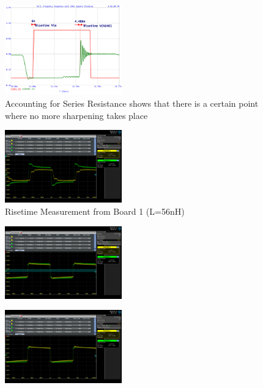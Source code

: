 \documentclass[journal]{IEEEtran} \usepackage[english]{babel}
\begin{document}
\begin{figure}[htb]
\centering
\includegraphics[width=0.45\textwidth]{Probed_Input_N10_N240_NoSeriesResistance}
\caption{Accounting for Series Resistance shows that there is a certain point where no more sharpening takes place}
\label{fig:probedWithResistance}
\end{figure}


\begin{figure}[htb]
\centering
\includegraphics[width=0.45\textwidth]{MeasuredSquareResponseB1.png}
\caption{Risetime Measurement from Board 1 (L=56nH)}
\label{fig:MeasuredSquareGeneric}
\end{figure}

\begin{figure}[htb]
\centering
\includegraphics[width=0.45\textwidth]{MeasuredSquare1VBiasB1.png}
\caption{}
\label{fig:MeasuredSquare1VBiasB1}
\end{figure}

\begin{figure}[htb]
\centering
\includegraphics[width=0.45\textwidth]{MeasuredSquare2VBiasB1.png}
\caption{}
\label{fig:Measured Risetime with 2V DC Bias}
\end{figure}
\end{document}

